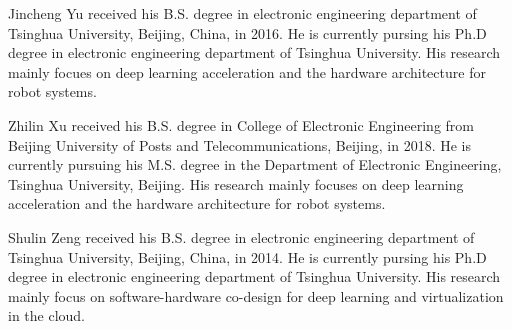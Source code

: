 \documentclass[journal]{IEEEtran}
\begin{document}




\begin{IEEEbiography}{Jincheng Yu}
  \footnotesize
  received his B.S. degree in electronic engineering department of Tsinghua University, Beijing, China, in 2016. He is currently pursing his Ph.D degree in electronic engineering department of Tsinghua University. His research mainly focues on deep learning acceleration and the hardware architecture for robot systems.
\end{IEEEbiography}



\begin{IEEEbiography}{Zhilin Xu}
  \footnotesize
  received his B.S. degree in College of Electronic Engineering from Beijing University of Posts and Telecommunications, Beijing, in 2018. He is currently pursuing his M.S. degree in the Department of Electronic Engineering, Tsinghua University, Beijing. His research mainly focuses on deep learning acceleration and the hardware architecture for robot systems. 
\end{IEEEbiography}


\begin{IEEEbiography}{Shulin Zeng}
  \footnotesize
  received his B.S. degree in electronic engineering department of Tsinghua University, Beijing, China, in 2014. He is currently pursing his Ph.D degree in electronic engineering department of Tsinghua University. His research mainly focus on software-hardware co-design for deep learning and virtualization in the cloud.
\end{IEEEbiography}
\end{document}
